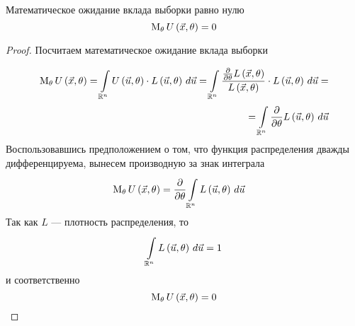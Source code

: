 \begin{lemma}\label{remark:expectationU}
  Математическое ожидание вклада выборки равно нулю
  \begin{equation*}
    \meanof{\theta}{U\left( \vec{x}, \theta \right)} = 0
  \end{equation*}
\end{lemma}
\begin{proof}
Посчитаем математическое ожидание вклада выборки

\begin{align*}
  \meanof{\theta}{U\left( \vec{x}, \theta \right)}
    = \integral{\mathbb{R}^n}{}{\vec{u}}
      {U\left( \vec{u}, \theta \right)
        \cdot L\left( \vec{u}, \theta \right)}
    = \integral{\mathbb{R}^n}{}{\vec{u}}
      {\frac{\frac{\partial}{\partial\theta}L\left(\vec{x}, \theta\right)}
        {L\left(\vec{x}, \theta\right)}
        \cdot L\left( \vec{u}, \theta \right)} = \\
    = \integral{\mathbb{R}^n}{}{\vec{u}}{\frac{\partial}{\partial\theta}
      L\left( \vec{u}, \theta \right)}
\end{align*}
Воспользовавшись предположением о том,
что функция распределения дважды дифференцируема,
вынесем производную за знак интеграла
\begin{align*}
  \meanof{\theta}{U\left( \vec{x},\theta \right)}
    &= \frac{\partial}{\partial\theta}
      \integral{\mathbb{R}^n}{}{\vec{u}}{L\left( \vec{u},\theta \right)}
\end{align*}
Так как $L$ --- плотность распределения, то
\begin{equation*}
  \integral{\mathbb{R}^n}{}{\vec{u}}{L\left( \vec{u}, \theta \right)} = 1
\end{equation*}
и соответственно
\begin{equation*}
  \meanof{\theta}{U\left( \vec{x}, \theta \right)} = 0
\end{equation*}
\end{proof}

\begin{comment}
\begin{remark}\label{remark:partialLikelihoodNull}
  Частная производная по параметру $\theta$ от функции правдоподобия
  $L\left( \vec{u},\theta \right)$ равна нулю.
\end{remark}
\begin{proof}
  Выше у нас было равенство
  $$\frac{\partial}{\partial\theta}
    \integral{\mathbb{R}^n}{}{\vec{u}}{L\left( \vec{u},\theta \right)}=0$$

  Так как производную можем заносить под знак интеграла
  (согласно замечанию \ref{remark:doubleDiff}), то получаем такое равенство
  $$\integral{\mathbb{R}^n}{}{\vec{u}}{
    \frac{\partial}{\partial\theta}L\left( \vec{u},\theta \right)}=0$$

  Поскольку интеграл не зависит от $\theta$,
  то такое возможно лишь в том случае, когда производная равна нулю
  $$\frac{\partial}{\partial\theta}L\left( \vec{u},\theta \right)=0$$
\end{proof}
\end{comment}

